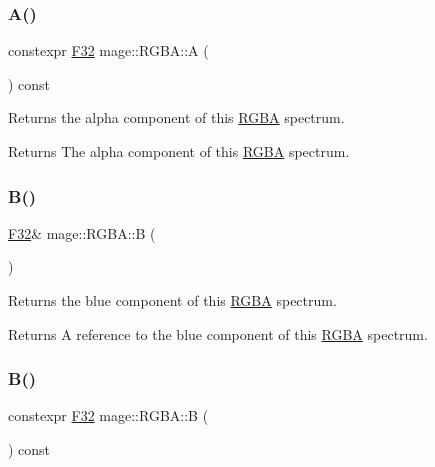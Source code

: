 \subsubsection{\texorpdfstring{A()}{A()}\hspace{0.1cm}{\footnotesize\ttfamily [2/2]}}
{\footnotesize\ttfamily constexpr \mbox{\hyperlink{namespacemage_aa97e833b45f06d60a0a9c4fc22ae02c0}{F32}} mage\+::\+R\+G\+B\+A\+::A (\begin{DoxyParamCaption}{ }\end{DoxyParamCaption}) const\hspace{0.3cm}{\ttfamily [noexcept]}}

Returns the alpha component of this \mbox{\hyperlink{structmage_1_1_r_g_b_a}{R\+G\+BA}} spectrum.

\begin{DoxyReturn}{Returns}
The alpha component of this \mbox{\hyperlink{structmage_1_1_r_g_b_a}{R\+G\+BA}} spectrum. 
\end{DoxyReturn}
\mbox{\label{structmage_1_1_r_g_b_a_a72720b917d5f38466e42177a541f789a}} 
\subsubsection{\texorpdfstring{B()}{B()}\hspace{0.1cm}{\footnotesize\ttfamily [1/2]}}
{\footnotesize\ttfamily \mbox{\hyperlink{namespacemage_aa97e833b45f06d60a0a9c4fc22ae02c0}{F32}}\& mage\+::\+R\+G\+B\+A\+::B (\begin{DoxyParamCaption}{ }\end{DoxyParamCaption})\hspace{0.3cm}{\ttfamily [noexcept]}}

Returns the blue component of this \mbox{\hyperlink{structmage_1_1_r_g_b_a}{R\+G\+BA}} spectrum.

\begin{DoxyReturn}{Returns}
A reference to the blue component of this \mbox{\hyperlink{structmage_1_1_r_g_b_a}{R\+G\+BA}} spectrum. 
\end{DoxyReturn}
\mbox{\label{structmage_1_1_r_g_b_a_aab14769a4c1660bc84ee6b23dc05e246}} 
\subsubsection{\texorpdfstring{B()}{B()}\hspace{0.1cm}{\footnotesize\ttfamily [2/2]}}
{\footnotesize\ttfamily constexpr \mbox{\hyperlink{namespacemage_aa97e833b45f06d60a0a9c4fc22ae02c0}{F32}} mage\+::\+R\+G\+B\+A\+::B (\begin{DoxyParamCaption}{ }\end{DoxyParamCaption}) const\hspace{0.3cm}{\ttfamily [noexcept]}}

